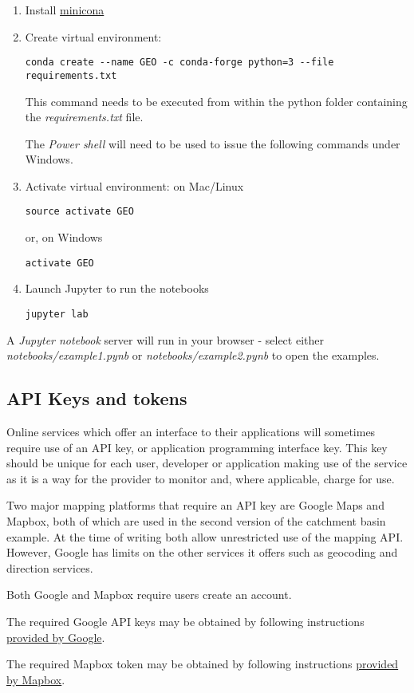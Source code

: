 \documentclass[utf8]{frontiers_suppmat} %
\begin{document}
\begin{enumerate}
\item  Install \href{https://docs.conda.io/en/latest/miniconda.html}{minicona}
\item  Create virtual environment: 
\begin{verbatim}
conda create --name GEO -c conda-forge python=3 --file requirements.txt
\end{verbatim}

This command needs to be executed from within the python folder containing the {\em requirements.txt} file.

The {\em Power shell} will need to be used to issue the following commands under Windows.

\item Activate virtual environment: 
on Mac/Linux
\begin{verbatim}
source activate GEO  
\end{verbatim}
or, on Windows
\begin{verbatim}
activate GEO 
\end{verbatim}
\item Launch Jupyter to run the notebooks
\begin{verbatim}
jupyter lab
\end{verbatim}
\end{enumerate}

A {\em Jupyter notebook} server will run in your browser - select
either {\em notebooks/example1.pynb} or {\em notebooks/example2.pynb}
to open the examples.


\subsection{API Keys and tokens}\label{api-keys}

Online services which offer an interface to their applications will
sometimes require use of an API key, or application programming
interface key. This key should be unique for each user, developer or
application making use of the service as it is a way for the provider to
monitor and, where applicable, charge for use.

Two major mapping platforms that require an API key are Google Maps
and Mapbox, both of which are used in the second version of the
catchment basin example. At the time of writing both allow
unrestricted use of the mapping API. However, Google has limits on the
other services it offers such as geocoding and direction services.

Both Google and Mapbox require users create an account.

The required Google API keys may be obtained by following instructions \href{https://developers.google.com/maps/documentation/embed/get-api-key}{provided by Google}.

The required Mapbox token may be obtained by following instructions \href{https://www.mapbox.com/account/access-tokens}{provided by Mapbox}.
\end{document}
